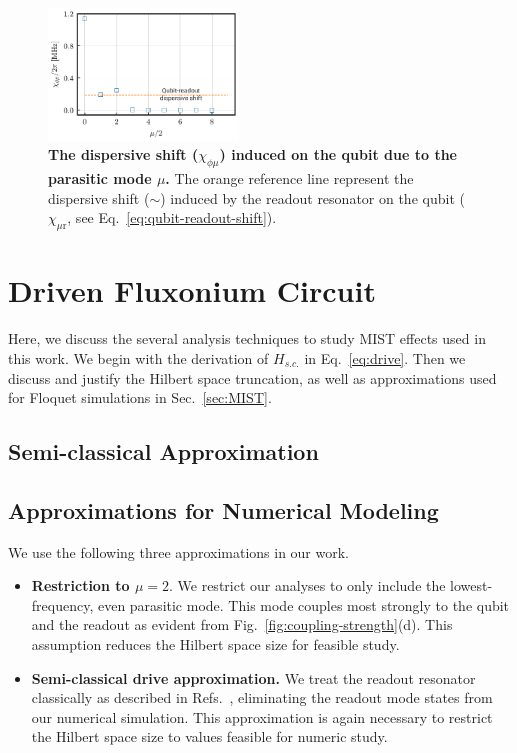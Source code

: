 \documentclass[%
reprint,
superscriptaddress,
 amsmath,amssymb,
 aps,
 prx,
longbibliography,
floatfix,
]{revtex4-2}
\newcommand{\sh}[1]{{\color{blue}{{}[SS: #1]}}}%
\begin{document}
{\begin{align}
\end{align}
\begin{figure}[htb]
    \centering
    \includegraphics[width=0.45\textwidth]{Supp_Fig/dispersive_shift.pdf}
    \caption{ {\bf The dispersive shift ($\chi_{\phi\mu}$) induced on the qubit due to the parasitic mode $\mu$.} The orange reference line represent the dispersive shift ($\sim $) induced by the readout resonator on the qubit ($\chi_{\mu\textrm{r}}$, see Eq.~\ref{eq:qubit-readout-shift}).}
    \label{fig:dispersive-shift}
\end{figure}

\section{Driven Fluxonium Circuit}\label{app:MIST}
Here, we discuss the several analysis techniques to study MIST effects used in this work. We begin with the derivation of $H_{s.c.}$ in Eq.~\ref{eq:drive}. Then we discuss and justify the Hilbert space truncation, as well as approximations used for Floquet simulations in Sec.~\ref{sec:MIST}.
\subsection{Semi-classical Approximation}\label{app:semi-classical}
\sh{include the derivation}
\subsection{Approximations for Numerical Modeling}\label{app:numerics}
We use the following three approximations in our work.
\begin{itemize}
    \item \textbf{Restriction to $\mu=2$}. We restrict our analyses to only include the lowest-frequency, even parasitic mode. This mode couples most strongly to the qubit and the readout as evident from Fig.~\ref{fig:coupling-strength}(d). This assumption reduces the Hilbert space size for feasible study. 

    \item \textbf{Semi-classical drive approximation.}  We treat the readout resonator classically as described in Refs.~\cite{xiao2023diagrammatic,dumas2024unified,cohen2023reminiscence,khezri2023measurement}, eliminating the readout mode states from our numerical simulation. This approximation is again necessary to restrict the Hilbert space size to values feasible for numeric study.
    

\end{itemize}}
\end{document}
